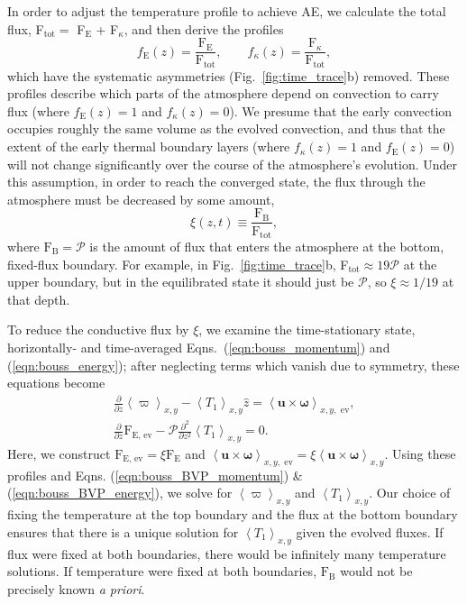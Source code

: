 \documentclass[aps, pre, onecolumn, nofootinbib, notitlepage, groupedaddress, amsfonts, amssymb, amsmath, longbibliography]{revtex4-1}
\newcommand{\angles}[1]{\ensuremath{\left\langle #1 \right\rangle}}
\begin{document}
In order to adjust the temperature profile to achieve AE, we calculate the total flux,
F$_{\text{tot}} =$ F$_{\text{E}}$ + F$_{\kappa}$, and then derive the profiles
\vspace{-0.5cm}
\begin{equation}
f_{\text{E}}(z) = \frac{\text{F}_{\text{E}}}{\text{F}_{\text{tot}}},\qquad
f_{\kappa}(z) = \frac{\text{F}_{\kappa}}{\text{F}_{\text{tot}}},
\label{eqn:bvp_ratios}
\end{equation}
which have the systematic asymmetries (Fig.~\ref{fig:time_trace}b) removed. These profiles describe which
parts of the atmosphere depend on convection to carry flux (where $f_{\text{E}}(z) = 1$
and $f_{\kappa}(z) = 0$).
We presume that the early convection occupies roughly the same volume as the evolved
convection, and thus that the extent of the early thermal boundary layers 
(where $f_{\kappa}(z) = 1$ and $f_{\text{E}}(z) = 0$) 
will not change significantly over the course of the atmosphere's evolution.
Under this assumption, in order to reach the converged state, 
the flux through the atmosphere must be decreased by some amount,
\vspace{-0.5cm}
\begin{equation}
\xi(z,t) \equiv \frac{\text{F}_{\text{B}}}{\text{F}_{\text{tot}}},
\label{eqn:xi}
\end{equation}
where $\text{F}_{\text{B}} = \mathcal{P}$ is the amount of flux that enters the
atmosphere at the bottom, fixed-flux boundary.
For example, in Fig.~\ref{fig:time_trace}b,
F$_{\text{tot}} \approx 19\mathcal{P}$ at the upper boundary,
but in the equilibrated state 
it should just be $\mathcal{P}$, so $\xi \approx 1/19$ at that depth.

To reduce the conductive flux by $\xi$, we examine the 
time-stationary state, horizontally- and time-averaged
Eqns.~(\ref{eqn:bouss_momentum}) and (\ref{eqn:bouss_energy}); after 
neglecting terms which vanish due to symmetry, these equations become
\vspace{-0.2cm}
\begin{gather}
\frac{\partial}{\partial z}\angles{\varpi}_{x,y} - \angles{T_1}_{x,y}\hat{z} = \angles{\bm{u}\times\bm{\omega}}_{x,y, \text{ ev}},
	\label{eqn:bouss_BVP_momentum}
\\
\frac{\partial}{\partial z}\text{F}_{\text{E, ev}} - \mathcal{P}\frac{\partial^2}{\partial z^2} \angles{T_1}_{x,y} = 0.
	\label{eqn:bouss_BVP_energy}
\end{gather}
Here, we construct  $\text{F}_{\text{E, ev}} = \xi \text{F}_{\text{E}}$ 
and $\angles{\bm{u}\times\bm{\omega}}_{x, y,\text{ ev}}
= \xi\angles{\bm{u}\times\bm{\omega}}_{x, y}$.
Using these profiles and 
Eqns. (\ref{eqn:bouss_BVP_momentum}) \& (\ref{eqn:bouss_BVP_energy}),
we solve for $\angles{\varpi}_{x,y}$ and $\angles{T_1}_{x,y}$.
Our choice of fixing the temperature at the top boundary and the flux at the bottom
boundary ensures that there is a unique solution for $\angles{T_1}_{x,y}$ given the evolved
fluxes. If flux were fixed at both boundaries, there would be infinitely many
temperature solutions. If temperature were fixed at both boundaries, 
$\text{F}_{\text{B}}$ would not be precisely known \emph{a priori}.
\end{document}
